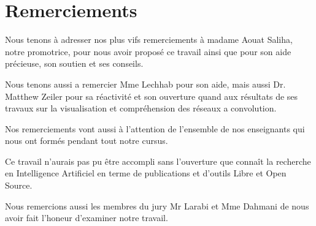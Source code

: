 
\chapter*{Remerciements} %

	Nous tenons à adresser nos plus vifs remerciements à madame Aouat Saliha, notre promotrice, pour nous avoir proposé ce travail ainsi que pour son aide précieuse, son soutien et ses conseils. 

	Nous tenons aussi a remercier Mme Lechhab pour son aide, mais aussi Dr. Matthew Zeiler pour sa réactivité et son ouverture quand aux résultats de ses travaux sur la visualisation et compréhension des réseaux a convolution.

	Nos remerciements vont aussi à l'attention de l'ensemble de nos enseignants qui nous ont formés pendant tout notre cursus.

	Ce travail n'aurais pas pu être accompli sans l'ouverture que connaît la recherche en Intelligence Artificiel en terme de publications et d'outils Libre et Open Source.
	
	Nous remercions aussi les membres du jury Mr Larabi et Mme Dahmani de nous avoir fait l'honeur d'examiner notre travail.



